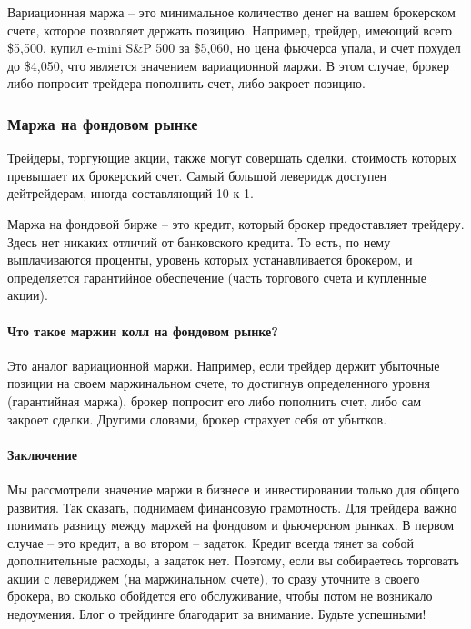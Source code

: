 \documentclass[a5paper]{article}
\begin{document}
Вариационная маржа – это минимальное количество денег на вашем
брокерском счете, которое позволяет держать позицию. Например,
трейдер, имеющий всего \$5,500, купил e-mini S\&P 500 за \$5,060, но
цена фьючерса упала,  и счет похудел до \$4,050, что является
значением вариационной маржи. В этом случае, брокер либо попросит
трейдера пополнить счет, либо закроет позицию.

\subsubsection{Маржа на фондовом рынке}

Трейдеры, торгующие акции, также могут совершать сделки, стоимость которых превышает их брокерский счет. Самый большой леверидж доступен дейтрейдерам, иногда составляющий 10 к 1.

Маржа на фондовой бирже – это кредит, который брокер предоставляет
трейдеру. Здесь нет никаких отличий от банковского кредита. То есть,
по нему выплачиваются проценты, уровень которых устанавливается
брокером, и определяется гарантийное обеспечение (часть торгового
счета и купленные акции).

\paragraph{Что такое маржин колл на фондовом рынке?}

Это аналог вариационной маржи. Например, если трейдер держит убыточные
позиции на своем маржинальном счете, то достигнув определенного уровня
(гарантийная маржа), брокер попросит его либо пополнить счет, либо сам
закроет сделки. Другими словами, брокер страхует себя от убытков.

\paragraph{Заключение}

Мы рассмотрели значение маржи в бизнесе и инвестировании только для общего развития. Так сказать, поднимаем финансовую грамотность. Для трейдера важно понимать разницу между маржей на фондовом и фьючерсном рынках. В первом случае – это кредит, а во втором – задаток. Кредит всегда тянет за собой дополнительные расходы, а задаток нет. Поэтому, если вы собираетесь торговать акции с левериджем (на маржинальном счете), то сразу уточните в своего брокера, во сколько обойдется его обслуживание, чтобы потом не возникало недоумения. Блог о трейдинге благодарит за внимание. Будьте успешными!
\end{document}
